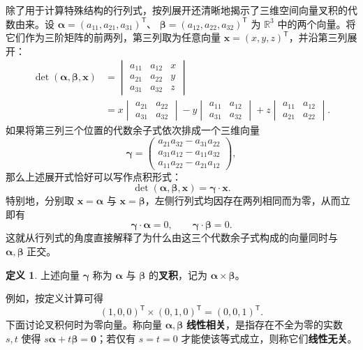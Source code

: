 \documentclass[UTF8, fontset=fandol, a4paper, 12pt]{ctexart}
\theoremstyle{definition}
\newtheorem{definition}[theorem]{定义}
\begin{document}
除了用于计算特殊结构的行列式，按列展开还清晰地揭示了三维空间向量叉积的代数由来。设 $\boldsymbol\alpha=(a_{11},a_{21},a_{31})^{\mathsf T}$、
$\boldsymbol\beta=(a_{12},a_{22},a_{32})^{\mathsf T}$ 为 $\mathbb R^3$ 中的两个向量。将它们作为三阶矩阵的前两列，第三列取为任意向量 $\boldsymbol x=(x,y,z)^{\mathsf T}$，并沿第三列展开：
\begin{align*}
 \det(\boldsymbol\alpha,\boldsymbol\beta,\boldsymbol x)
 &=\begin{vmatrix}a_{11}&a_{12}&x\\a_{21}&a_{22}&y\\a_{31}&a_{32}&z\end{vmatrix}\\
 &=x\begin{vmatrix}a_{21}&a_{22}\\a_{31}&a_{32}\end{vmatrix}
 -y\begin{vmatrix}a_{11}&a_{12}\\a_{31}&a_{32}\end{vmatrix}
 +z\begin{vmatrix}a_{11}&a_{12}\\a_{21}&a_{22}\end{vmatrix}.
\end{align*}
如果将第三列三个位置的代数余子式依次排成一个三维向量
\[
 \boldsymbol\gamma=
 \begin{pmatrix}
 a_{21}a_{32}-a_{31}a_{22}\\
 a_{31}a_{12}-a_{11}a_{32}\\
 a_{11}a_{22}-a_{21}a_{12}
 \end{pmatrix},
\]
那么上述展开式恰好可以写作点积形式：
\[
 \det(\boldsymbol\alpha,\boldsymbol\beta,\boldsymbol x)
 =\boldsymbol\gamma\cdot\boldsymbol x.
\]
特别地，分别取 $\boldsymbol x=\boldsymbol\alpha$ 与 $\boldsymbol x=\boldsymbol\beta$，左侧行列式均因存在两列相同而为零，从而立即有
\[
 \boldsymbol\gamma\cdot\boldsymbol\alpha=0,
 \qquad \boldsymbol\gamma\cdot\boldsymbol\beta=0.
\]
这就从行列式的角度直接解释了为什么由这三个代数余子式构成的向量同时与 $\boldsymbol\alpha,\boldsymbol\beta$ 正交。

\begin{definition}
上述向量 $\boldsymbol\gamma$ 称为 $\boldsymbol\alpha$ 与 $\boldsymbol\beta$ 的\textbf{叉积}，记为
$\boldsymbol\alpha\times\boldsymbol\beta$。
\end{definition}

例如，按定义计算可得
\[
 (1,0,0)^{\mathsf T}\times(0,1,0)^{\mathsf T}=(0,0,1)^{\mathsf T}.
\]
下面讨论叉积何时为零向量。称向量 $\boldsymbol\alpha,\boldsymbol\beta$ \textbf{线性相关}，是指存在不全为零的实数 $s,t$ 使得 $s\boldsymbol\alpha+t\boldsymbol\beta=\boldsymbol0$；若仅有 $s=t=0$ 才能使该等式成立，则称它们\textbf{线性无关}。
\end{document}
